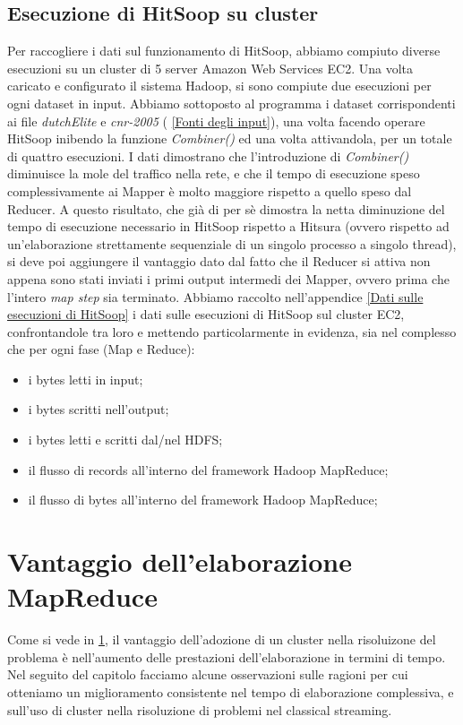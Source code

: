 \documentclass[a4paper,11pt]{report}
\begin{document}
\section{Esecuzione di HitSoop su cluster}\label{Prestazioni}
Per raccogliere i dati sul funzionamento di HitSoop, abbiamo compiuto diverse esecuzioni su un cluster di 5 server Amazon Web Services EC2. 
Una volta caricato e configurato il sistema Hadoop, si sono compiute due esecuzioni per ogni dataset in input. Abbiamo sottoposto al
programma
i dataset corrispondenti ai file \emph{dutchElite} e \emph{cnr-2005} ( \ref{Fonti degli input}), una volta facendo operare HitSoop inibendo
la
funzione \emph{Combiner()} ed una volta attivandola, per un totale di quattro esecuzioni. I dati dimostrano che l'introduzione 
di \emph{Combiner()} diminuisce la mole del traffico nella rete, e che il tempo di esecuzione speso complessivamente ai Mapper è
molto maggiore rispetto a quello speso dal Reducer. A questo risultato, che già di per sè dimostra la netta diminuzione del tempo di
esecuzione
necessario in HitSoop rispetto a Hitsura (ovvero rispetto ad un'elaborazione strettamente sequenziale di un singolo processo a singolo
thread),
si deve poi aggiungere il vantaggio dato dal fatto che il Reducer si attiva non appena sono stati inviati i primi output intermedi dei
Mapper, ovvero prima che
l'intero \emph{map step} sia terminato.
Abbiamo raccolto nell'appendice \ref{Dati sulle esecuzioni di HitSoop} i dati sulle esecuzioni di HitSoop sul cluster EC2, confrontandole
tra loro e mettendo 
particolarmente in evidenza, sia nel complesso che per ogni fase (Map e Reduce):
\begin{itemize}
 \item i bytes letti in input;
 \item i bytes scritti nell'output;
 \item i bytes letti e scritti dal/nel HDFS;
 \item il flusso di records all'interno del framework Hadoop MapReduce;
 \item il flusso di bytes all'interno del framework Hadoop MapReduce;
\end{itemize}




\chapter{Vantaggio dell'elaborazione MapReduce}
Come si vede in \ref{Prestazioni}, il vantaggio dell'adozione di un cluster nella risoluizone del problema è nell'aumento delle prestazioni
dell'elaborazione
in termini di tempo. Nel seguito del capitolo facciamo alcune osservazioni sulle ragioni per cui otteniamo un miglioramento consistente nel
tempo di elaborazione complessiva, 
 e sull'uso  di cluster nella risoluzione di problemi nel classical streaming.
\end{document}
